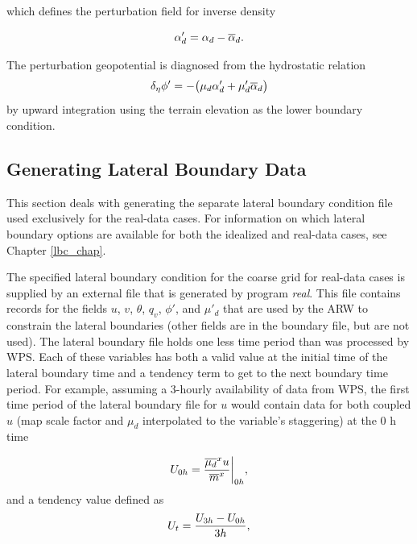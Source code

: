 \noindent which defines the perturbation field for inverse density

\begin{equation}
\alpha'_d = \alpha_d - \overline{\alpha}_d.
\notag
\end{equation}

\noindent 
The perturbation geopotential 
is diagnosed from the hydrostatic relation
\begin{equation}
\delta_{\eta} \phi'  = - \big ( {\mu}_d \alpha'_d + \mu'_d
\overline{\alpha}_d \big )
\notag
\end{equation}
%
by upward integration using the terrain elevation as the lower boundary condition.

\subsection{Generating Lateral Boundary Data}

This section deals with generating the separate lateral boundary condition file used
exclusively for the real-data cases.  For information
on which lateral boundary options are available for both the idealized and real-data
cases, see Chapter \eqref{lbc_chap}.

The specified 
lateral boundary condition for the coarse grid for real-data cases is supplied by an external file that is
generated by program {\it real}.
This file contains 
records for the fields $u$, $v$, $\theta$, $q_v$, $\phi'$, and $\mu'_d$ that are used by the ARW to
constrain the lateral boundaries (other fields are in the boundary file, but are not used).   
The lateral boundary file holds one less time period than was processed by WPS.
Each of these variables has both
a valid value at the initial time of the lateral boundary time and a tendency term to get to the 
next boundary time period.  For example, assuming a 3-hourly availability of data from WPS,
the first time period of the lateral boundary file
for $u$ would contain data for both coupled $u$ (map scale factor and $\mu_d$ interpolated to 
the variable's 
staggering) at the 0 h time

\begin{equation}
U_{0h} = {{\overline{\mu_d}^x u}\over{\overline{m}^x}} \bigg | _{0h},
\notag
\end{equation}
\noindent and a tendency value defined as
\begin{equation}
U_t = { U_{3h} - U_{0h} \over 3h},
\notag
\end{equation}

